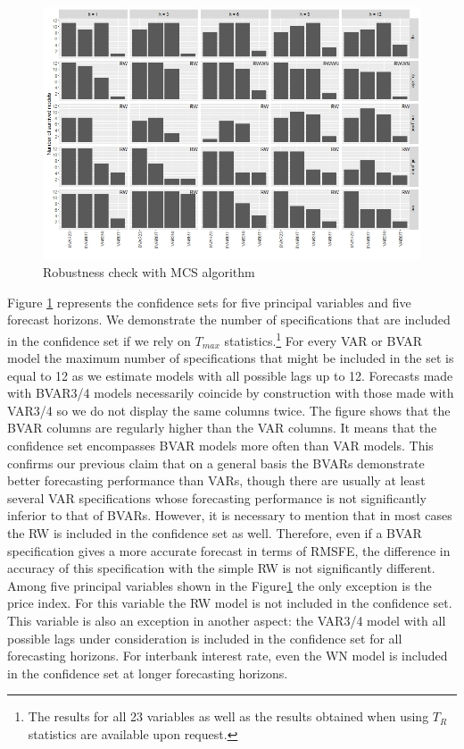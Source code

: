 \documentclass[11pt]{article} %
\begin{document}
\begin{figure}[!h]
\begin{center}
\includegraphics[scale=0.40]{histo_with_names.jpeg}
\caption{Robustness check with MCS algorithm}
\label{fig:mcs}
\end{center}
\end{figure}

Figure \ref{fig:mcs} represents the confidence sets for five principal variables and five forecast horizons. We demonstrate the number of specifications that are included in the confidence set if we rely on $T_{max}$ statistics.\footnote{The results for all 23 variables as well as the results obtained when using $T_{R}$ statistics are available upon request.} For every VAR or BVAR model the maximum number of specifications that might be included in the set is equal to 12 as we estimate models with all possible lags up to 12.  Forecasts made with BVAR3/4 models  necessarily coincide by construction with those made with VAR3/4 so we do not display the same columns twice. The figure shows that the BVAR columns are regularly higher than the VAR columns. It means that the confidence set encompasses BVAR models more often than VAR models. This confirms our previous claim that on a general basis the BVARs demonstrate better forecasting performance than VARs, though there are usually at least several VAR specifications whose forecasting performance is not significantly inferior to that of BVARs. However, it is necessary to mention that in most cases the RW is included in the confidence set as well. Therefore, even if a BVAR specification gives a more accurate forecast in terms of RMSFE, the difference in accuracy of this specification with the simple RW is not significantly different. Among five principal variables shown in the Figure\ref{fig:mcs} the only exception is the price index. For this variable the RW model is not included in the confidence set. This variable is also an exception in another aspect: the VAR3/4 model with all possible lags  under consideration is included in the confidence set for all forecasting horizons. For interbank interest rate, even the WN model is included in the confidence set at longer forecasting horizons.
\end{document}
